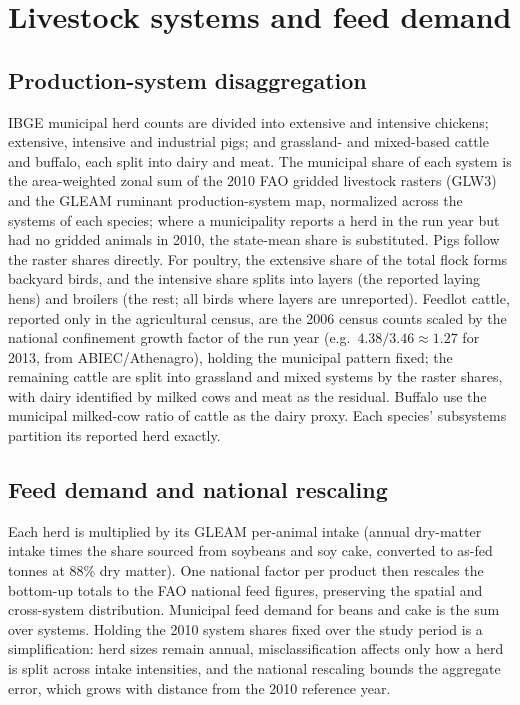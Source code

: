 \section{Livestock systems and feed demand}\label{app:livestock}

\subsection{Production-system disaggregation}
IBGE municipal herd counts are divided into extensive and intensive
chickens; extensive, intensive and industrial pigs; and grassland- and
mixed-based cattle and buffalo, each split into dairy and meat. The
municipal share of each system is the area-weighted zonal sum of the
2010 FAO gridded livestock rasters (GLW3) and the GLEAM ruminant
production-system map, normalized across the systems of each species;
where a municipality reports a herd in the run year but had no gridded
animals in 2010, the state-mean share is substituted. Pigs follow the
raster shares directly. For poultry, the extensive share of the total
flock forms backyard birds, and the intensive share splits into layers
(the reported laying hens) and broilers (the rest; all birds where
layers are unreported). Feedlot cattle, reported only in the
agricultural census, are the 2006 census counts scaled by the national
confinement growth factor of the run year (e.g.\
$4.38/3.46\approx1.27$ for 2013, from ABIEC/Athenagro), holding the
municipal pattern fixed; the remaining cattle are split into grassland
and mixed systems by the raster shares, with dairy identified by
milked cows and meat as the residual. Buffalo use the municipal
milked-cow ratio of cattle as the dairy proxy. Each species'
subsystems partition its reported herd exactly.

\subsection{Feed demand and national rescaling}
Each herd is multiplied by its GLEAM per-animal intake (annual dry-matter
intake times the share sourced from soybeans and soy cake, converted to
as-fed tonnes at 88\% dry matter). One national factor per product then
rescales the bottom-up totals to the FAO national feed figures,
preserving the spatial and cross-system distribution.
Municipal feed demand for beans and cake is the sum over systems. Holding
the 2010 system shares fixed over the study period is a simplification:
herd sizes remain annual, misclassification affects only how a herd is
split across intake intensities, and the national rescaling bounds the
aggregate error, which grows with distance from the 2010 reference year.


